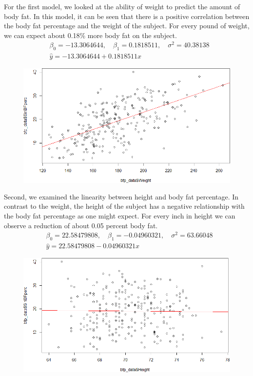 \documentclass[a4paper, 11pt]{article}
\begin{document}
For the first model, we looked at the ability of weight to predict the amount of body fat. In this model, it can be seen that there is a positive correlation between the body fat percentage and the weight of the subject. For every pound of weight, we can expect about 0.18\% more body fat on the subject.
\begin{align*}
	&\beta_0 = -13.3064644 ,\quad \beta_1 = 0.1818511 ,\quad \sigma^2 =  40.38138 \\
	&\hat{y} = -13.3064644 + 0.1818511 x
\end{align*}
\begin{figure}[H]
	\centering
	\includegraphics[scale=0.65]{weight_plot.png}
\end{figure}

Second, we examined the linearity between height and body fat percentage. In contrast to the weight, the height of the subject has a negative relationship with the body fat percentage as one might expect. For every inch in height we can observe a reduction of about 0.05 percent body fat.
\begin{align*}
	&\beta_0 = 22.58479808 ,\quad \beta_1 = -0.04960321 ,\quad \sigma^2 =  63.66048 \\
	&\hat{y} = 22.58479808 - 0.04960321 x
\end{align*}
\begin{figure}[H]
	\centering
	\includegraphics[scale=0.65]{height_plot.png}
\end{figure}
\end{document}
